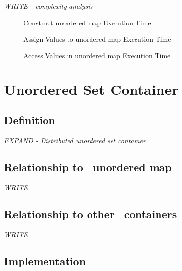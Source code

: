 \textit{WRITE - complexity analysis}

\begin{figure}[p]
\caption{Construct unordered map Execution Time}
\label{fig:unmap-cont-constr-exper}
\end{figure}

\begin{figure}[p]
\caption{Assign Values to unordered map Execution Time}
\label{fig:unmap-cont-assign-exper}
\end{figure}

\begin{figure}[p]
\caption{Access Values in unordered map Execution Time}
\label{fig:unmap-cont-access-exper}
\end{figure}


\section{ Unordered Set Container} \label{sec-unset-cont}

\subsection{Definition}

\textit{EXPAND - Distributed unordered set container.}

\subsection{Relationship to \stl\ unordered map}

\textit{WRITE}

\subsection{Relationship to other \stapl\ containers}

\textit{WRITE}

\subsection{Implementation}

